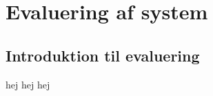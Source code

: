 \chapter{Evaluering af system} 
\section{Introduktion til evaluering} \label{App:Intro}

hej hej hej